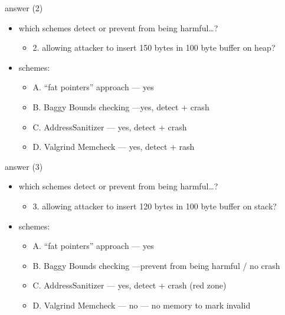 \begin{frame}{answer (2)}
\begin{itemize}
\item which schemes detect or prevent from being harmful\ldots?
    \begin{itemize}
    \item 2. allowing attacker to insert 150 bytes in 100 byte buffer on heap?
    \end{itemize}
\item schemes:
    \begin{itemize}
    \item A. ``fat pointers'' approach --- yes
    \item B. Baggy Bounds checking ---yes, detect + crash
    \item C. AddressSanitizer --- yes, detect + crash
    \item D. Valgrind Memcheck --- yes, detect + rash
    \end{itemize}
\end{itemize}
\end{frame}

\begin{frame}{answer (3)}
\begin{itemize}
\item which schemes detect or prevent from being harmful\ldots?
    \begin{itemize}
    \item 3. allowing attacker to insert 120 bytes in 100 byte buffer on stack?
    \end{itemize}
\item schemes:
    \begin{itemize}
    \item A. ``fat pointers'' approach --- yes
    \item B. Baggy Bounds checking ---prevent from being harmful / no crash
    \item C. AddressSanitizer --- yes, detect + crash (red zone)
    \item D. Valgrind Memcheck --- no --- no memory to mark invalid
    \end{itemize}
\end{itemize}
\end{frame}

